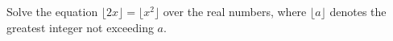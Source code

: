 Solve the equation $\lfloor 2x\rfloor=\lfloor x^2\rfloor$ over the real numbers, where $\lfloor a\rfloor$ denotes the greatest integer not exceeding $a$.
